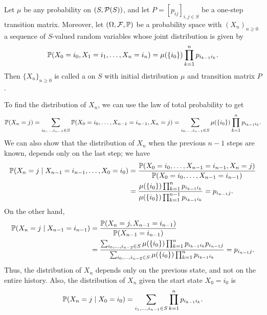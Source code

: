 \begin{definition}
    Let $\mu$ be any probability on $(S,\mathcal{P}(S))$, and let $P = [p_{ij}]_{i,j \in S}$ be a one-step transition matrix. Moreover, let $(\Omega,\mathcal{F},\mathbb{P})$ be a probability space with $(X_{n})_{n \geq 0}$ a sequence of $S$-valued random variables whose joint distribution is given by
    \begin{align}
        \mathbb{P}(X_{0}=i_{0},X_{1}=i_{1},\ldots,X_{n}=i_{n}) = \mu(\{i_{0}\})\prod_{k=1}^{n} p_{i_{k-1}i_{k}}.
    \end{align}
    Then $\{X_{n}\}_{n \geq 0}$ is called a  on $S$ with initial distribution $\mu$ and transition matrix $P$.
\end{definition}
To find the distribution of $X_{n}$, we can use the law of total probability to get
\begin{align}
    \mathbb{P}(X_{n}=j) = \sum_{i_{0},\ldots,i_{n-1} \in S} \mathbb{P}(X_{0}=i_{0},\ldots,X_{n-1}=i_{n-1},X_{n}=j) = \sum_{i_{0},\ldots,i_{n-1} \in S} \mu(\{i_{0}\})\prod_{k=1}^{n} p_{i_{k-1}i_{k}}.
\end{align}
We can also show that the distribution of $X_{n}$ when the previous $n-1$ steps are known, depends only on the last step; we have
\begin{align}
    \mathbb{P}(X_{n}=j \mid X_{n-1}=i_{n-1},\ldots,X_{0}=i_{0}) &= \frac{\mathbb{P}(X_{0}=i_{0},\ldots,X_{n-1}=i_{n-1},X_{n}=j)}{\mathbb{P}(X_{0}=i_{0},\ldots,X_{n-1}=i_{n-1})} \notag \\ &= \frac{\mu(\{i_{0}\})\prod_{k=1}^{n} p_{i_{k-1}i_{k}}}{\mu(\{i_{0}\})\prod_{k=1}^{n-1} p_{i_{k-1}i_{k}}} = p_{i_{n-1}j}.
\end{align}
On the other hand,
\begin{align}
    \mathbb{P}(X_{n}=j \mid X_{n-1}=i_{n-1}) &= \frac{\mathbb{P}(X_{n}=j,X_{n-1}=i_{n-1})}{\mathbb{P}(X_{n-1}=i_{n-1})} \notag \\ &= \frac{\sum_{i_{0},\ldots,i_{n-2} \in S} \mu(\{i_{0}\})\prod_{k=1}^{n} p_{i_{k-1}i_{k}}p_{i_{n-1}j}}{\sum_{i_{0},\ldots,i_{n-2} \in S} \mu(\{i_{0}\})\prod_{k=1}^{n} p_{i_{k-1}i_{k}}} = p_{i_{n-1}j}.
\end{align}
Thus, the distribution of $X_{n}$ depends only on the previous state, and not on the entire history. Also, the distribution of $X_{n}$ given the start state $X_0 = i_0$ is
\begin{align}
    \mathbb{P}(X_{n}=j \mid X_{0}=i_{0}) = \sum_{i_{1},\ldots,i_{n-1} \in S} \prod_{k=1}^{n} p_{i_{k-1}i_{k}}.
\end{align}

